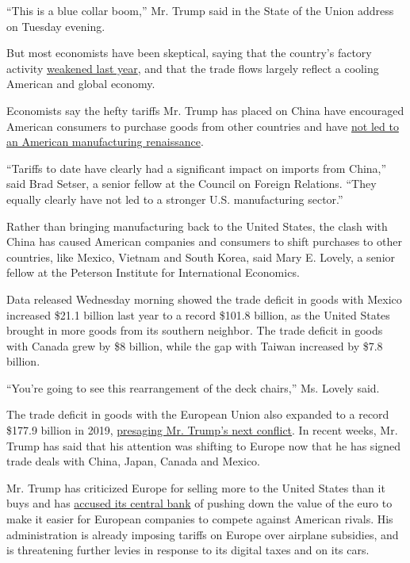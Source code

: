``This is a blue collar boom,'' Mr. Trump said in the State of the Union
address on Tuesday evening.

But most economists have been skeptical, saying that the country's
factory activity
\href{https://fred.stlouisfed.org/series/INDPRO}{weakened last year},
and that the trade flows largely reflect a cooling American and global
economy.

Economists say the hefty tariffs Mr. Trump has placed on China have
encouraged American consumers to purchase goods from other countries and
have
\href{https://www.nytimes3xbfgragh.onion/2020/01/10/upshot/economy-in-a-nutshell-manufacturing-in-recession-services-booming.html}{not
led to an American manufacturing renaissance}.

``Tariffs to date have clearly had a significant impact on imports from
China,'' said Brad Setser, a senior fellow at the Council on Foreign
Relations. ``They equally clearly have not led to a stronger U.S.
manufacturing sector.''

Rather than bringing manufacturing back to the United States, the clash
with China has caused American companies and consumers to shift
purchases to other countries, like Mexico, Vietnam and South Korea, said
Mary E. Lovely, a senior fellow at the Peterson Institute for
International Economics.

Data released Wednesday morning showed the trade deficit in goods with
Mexico increased \$21.1 billion last year to a record \$101.8 billion,
as the United States brought in more goods from its southern neighbor.
The trade deficit in goods with Canada grew by \$8 billion, while the
gap with Taiwan increased by \$7.8 billion.

``You're going to see this rearrangement of the deck chairs,'' Ms.
Lovely said.

The trade deficit in goods with the European Union also expanded to a
record \$177.9 billion in 2019,
\href{https://www.nytimes3xbfgragh.onion/2020/01/16/business/economy/trump-EU-trade-fight.html}{presaging
Mr. Trump's next conflict}. In recent weeks, Mr. Trump has said that his
attention was shifting to Europe now that he has signed trade deals with
China, Japan, Canada and Mexico.

Mr. Trump has criticized Europe for selling more to the United States
than it buys and has
\href{https://www.nytimes3xbfgragh.onion/2019/06/18/business/ecb-mario-draghi-stimulus.html}{accused
its central bank} of pushing down the value of the euro to make it
easier for European companies to compete against American rivals. His
administration is already imposing tariffs on Europe over airplane
subsidies, and is threatening further levies in response to its digital
taxes and on its cars.

